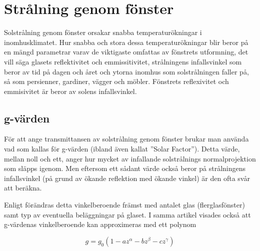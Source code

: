 \section{Strålning genom fönster}

Solstrålning genom fönster orsakar snabba temperaturökningar i inomhusklimatet. Hur snabba och stora dessa temperaturökningar blir beror på en mängd parametrar varav de viktigaste omfattas av fönstrets utformning, det vill säga glasets reflektivitet och emmissitivitet, strålningens infallsvinkel som beror av tid på dagen och året och ytorna inomhus som solstrålningen faller på, så som persienner, gardiner, vägger och möbler. Fönstrets reflexivitet och emmisivitet är beror av solens infallsvinkel.


\subsection{g-värden}\label{gvalue}

För att ange transmittansen av solstrålning genom fönster brukar man använda vad som kallas för g-värden (ibland även kallat ''Solar Factor''). Detta värde, mellan noll och ett, anger hur mycket av infallande solstrålnings normalprojektion som släpps igenom. Men eftersom ett sådant värde också beror på strålningens infallsvinkel (på grund av ökande reflektion med ökande vinkel) är den ofta svår att beräkna.

Enligt \cite{karlssonroos99} förändras detta vinkelberoende främst med antalet glas (flerglasfönster) samt typ av eventuella beläggningar på glaset. I samma artikel visades också att g-värdenas vinkelberoende kan approximeras med ett polynom

\begin{equation}\label{eq:radiationwindowstheory:gvalue}
g = g_0 \left( 1 - az^{\alpha} - bz^{\beta} - cz^{\gamma} \right)
\end{equation}

